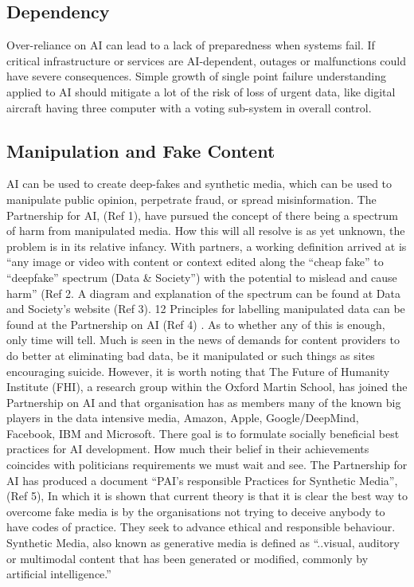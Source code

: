 \subsection{Dependency}
Over-reliance on AI can lead to a lack of preparedness when systems fail. If critical infrastructure or services are AI-dependent, outages or malfunctions could have severe consequences. Simple growth of single point failure understanding applied to AI should mitigate a lot of the risk of loss of urgent data, like digital aircraft having three computer with a voting sub-system in overall control.

\subsection{Manipulation and Fake Content}
AI can be used to create deep-fakes and synthetic media, which can be used to manipulate public opinion, perpetrate fraud, or spread misinformation. The Partnership for AI, (Ref 1),  have pursued the concept of there being a spectrum of harm from manipulated media. How this will all resolve is as yet unknown, the problem is in its relative infancy. With partners, a working definition arrived at is “any image or video with content or context edited along the “cheap fake” to “deepfake” spectrum (Data \& Society”) with the potential to mislead and cause harm” (Ref 2. A diagram and explanation of the spectrum can be found at Data and Society’s website (Ref 3). 12 Principles for labelling manipulated data can be found at the Partnership on AI (Ref 4) . As to whether any of this is enough, only time will tell. Much is seen in the news of demands for content providers to do better at eliminating bad data, be it manipulated or such things as sites encouraging suicide. However, it is worth noting that The Future of Humanity Institute (FHI), a research group within the Oxford Martin School, has joined the Partnership on AI and that organisation has as members many of the known big players in the data intensive media, Amazon, Apple, Google/DeepMind, Facebook, IBM and Microsoft. There goal is to formulate socially beneficial best practices for AI development. How much their belief in their achievements coincides with politicians requirements we must wait and see.  The Partnership for AI has produced a document “PAI’s responsible Practices for Synthetic Media”, (Ref 5), In which it is shown that current theory is that it is clear the best way to overcome fake media is by the organisations not trying to deceive anybody to have codes of practice. They seek to advance ethical and responsible behaviour. Synthetic Media, also known as generative media is defined as “..visual, auditory or multimodal content that has been generated or modified, commonly by artificial intelligence.”

